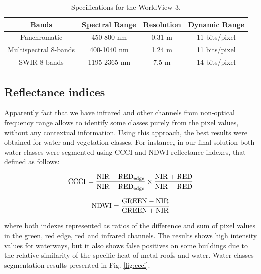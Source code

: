 \documentclass[10pt,twocolumn,letterpaper]{article}
\begin{document}
\begin{table}[th]
	\centering
	\begin{tabular}{|c|c|c|c|}
		\hline
		\textbf{Bands} & \textbf{Spectral Range} & \textbf{Resolution} & \textbf{Dynamic Range} \\ \hline
		Panchromatic & 450-800 nm & 0.31 m & 11 bits/pixel\\ \hline
		Multispectral 8-bands & 400-1040 nm & 1.24 m & 11 bits/pixel \\ \hline
		SWIR 8-bands & 1195-2365 nm & 7.5 m & 14 bits/pixel\\ \hline
	\end{tabular}
	\caption{Specifications for the WorldView-3.}
	\label{table:specs}
\end{table}


\subsection{Reflectance indices}
\label{subsec:reflectance}

Apparently fact that we have infrared and other channels from non-optical frequency range allows to identify some classes purely from the pixel values, without any contextual information. Using this approach, the best results were obtained for water and vegetation classes. For instance, in our final solution both water classes were segmented using CCCI \cite{ccci} and NDWI reflectance indexes, that defined as follows:

\begin{equation}
{\rm CCCI} = \frac{{\rm NIR} - {\rm RED}_{\rm edge}}{{\rm NIR} + {\rm RED}_{\rm edge}}\times{\frac{{\rm NIR} + {\rm RED}}{{\rm NIR} - {\rm RED}}}
\end{equation} 

\begin{equation}
{\rm NDWI} = \frac{{\rm GREEN} - {\rm NIR}}{{\rm GREEN} + {\rm NIR}}
\end{equation} 

\noindent where both indexes represented as ratios of the difference and sum of pixel values in the green, red edge, red and infrared channels. The results shows high intensity values for waterways, but it also shows false positives on some buildings due to the relative similarity of the specific heat of metal roofs and water. Water classes segmentation results presented in Fig. \ref{fig:ccci}.
\end{document}
